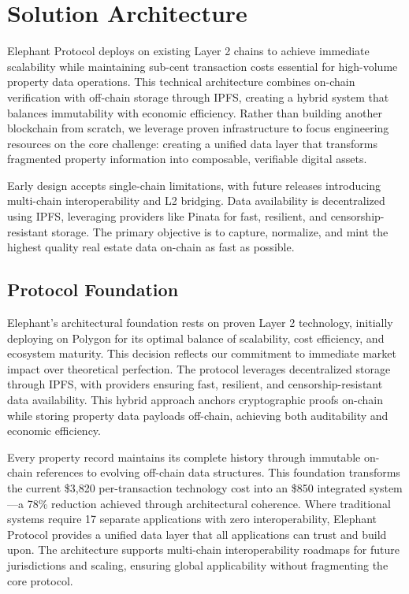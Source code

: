 \chapter{Solution Architecture}

Elephant Protocol deploys on existing Layer 2 chains to achieve immediate scalability while maintaining sub-cent transaction costs essential for high-volume property data operations. This technical architecture combines on-chain verification with off-chain storage through IPFS, creating a hybrid system that balances immutability with economic efficiency. Rather than building another blockchain from scratch, we leverage proven infrastructure to focus engineering resources on the core challenge: creating a unified data layer that transforms fragmented property information into composable, verifiable digital assets.

Early design accepts single-chain limitations, with future releases introducing multi-chain interoperability and L2 bridging. Data availability is decentralized using IPFS, leveraging providers like Pinata for fast, resilient, and censorship-resistant storage. The primary objective is to capture, normalize, and mint the highest quality real estate data on-chain as fast as possible.

\section{Protocol Foundation}

Elephant's architectural foundation rests on proven Layer 2 technology, initially deploying on Polygon for its optimal balance of scalability, cost efficiency, and ecosystem maturity. This decision reflects our commitment to immediate market impact over theoretical perfection. The protocol leverages decentralized storage through IPFS, with providers ensuring fast, resilient, and censorship-resistant data availability. This hybrid approach anchors cryptographic proofs on-chain while storing property data payloads off-chain, achieving both auditability and economic efficiency.

Every property record maintains its complete history through immutable on-chain references to evolving off-chain data structures. This foundation transforms the current \$3,820 per-transaction technology cost into an \$850 integrated system---a 78\% reduction achieved through architectural coherence. Where traditional systems require 17 separate applications with zero interoperability, Elephant Protocol provides a unified data layer that all applications can trust and build upon. The architecture supports multi-chain interoperability roadmaps for future jurisdictions and scaling, ensuring global applicability without fragmenting the core protocol.


